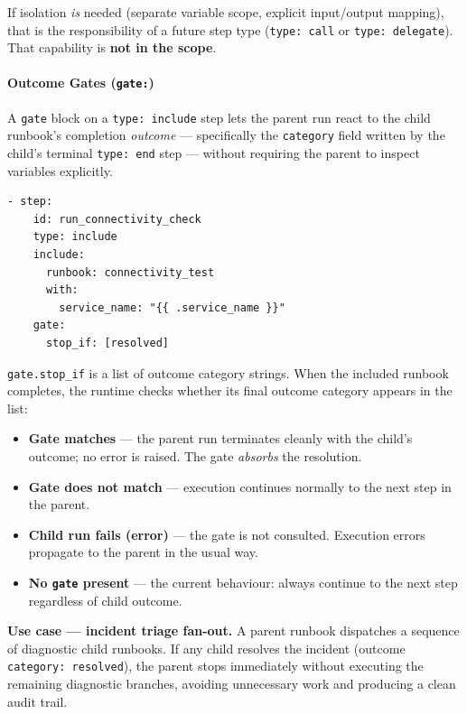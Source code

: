 If isolation \emph{is} needed (separate variable scope, explicit input/output
mapping), that is the responsibility of a future step type
(\texttt{type: call} or \texttt{type: delegate}).  That capability is
\textbf{not in the scope}.

\paragraph{Outcome Gates (\texttt{gate:})}
\label{para:include-gate}

A \texttt{gate} block on a \texttt{type: include} step lets the parent run
react to the child runbook's completion \emph{outcome} — specifically the
\texttt{category} field written by the child's terminal \texttt{type: end}
step — without requiring the parent to inspect variables explicitly.

\begin{verbatim}
- step:
    id: run_connectivity_check
    type: include
    include:
      runbook: connectivity_test
      with:
        service_name: "{{ .service_name }}"
    gate:
      stop_if: [resolved]
\end{verbatim}

\texttt{gate.stop\_if} is a list of outcome category strings.  When the
included runbook completes, the runtime checks whether its final outcome
category appears in the list:

\begin{itemize}
  \item \textbf{Gate matches} — the parent run terminates cleanly with the
        child's outcome; no error is raised.  The gate \emph{absorbs} the
        resolution.
  \item \textbf{Gate does not match} — execution continues normally to the
        next step in the parent.
  \item \textbf{Child run fails (error)} — the gate is not consulted.
        Execution errors propagate to the parent in the usual way.
  \item \textbf{No \texttt{gate} present} — the current behaviour: always
        continue to the next step regardless of child outcome.
\end{itemize}

\textbf{Use case — incident triage fan-out.}  A parent runbook dispatches a
sequence of diagnostic child runbooks.  If any child resolves the incident
(outcome \texttt{category: resolved}), the parent stops immediately without
executing the remaining diagnostic branches, avoiding unnecessary work and
producing a clean audit trail.

